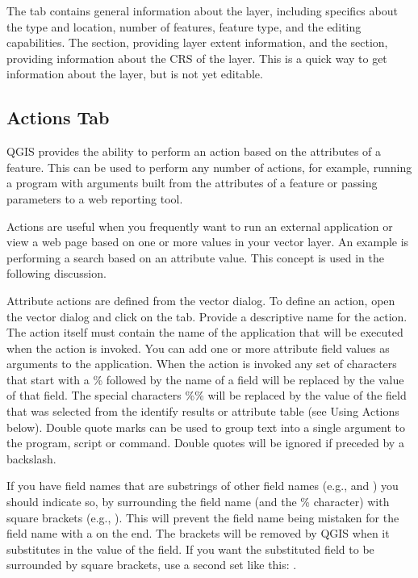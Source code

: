 The  tab contains general information about the layer,
including specifics about the type and location, number of features, feature
type, and the editing capabilities. The  section,
providing
layer extent information, and the 
section, providing information about the CRS of the layer. This is a quick
way to get information about the layer, but is not yet editable.

\subsection{Actions Tab}\label{label_actions}

QGIS provides the ability to perform an action based on the attributes of a
feature. This can be used to perform any number of actions, for example,
running a program with arguments built from the attributes of a feature or
passing parameters to a web reporting tool.

Actions are useful when you frequently want to run an external application or
view a web page based on one or more values in your vector layer. An example
is performing a search based on an attribute value. This concept is used in 
the following discussion.


Attribute actions are defined from the vector  dialog. To
define an action, open the vector  dialog and click on the
 tab. Provide a descriptive name for the action. The action
itself must contain the name of the application that will be executed when the
action is invoked. You can add one or more attribute field values as arguments
to the application. When the action is invoked any set of characters that
start with a \% followed by the name of a field will be replaced by the value of
that field. The special characters \%\% \index{\%\%}will be replaced by the value
of the field that was selected from the identify results or attribute table (see
Using Actions below).  Double quote marks can be used to group text into a
single argument to the program, script or command. Double quotes will be
ignored if preceded by a backslash.

If you have field names that are substrings of other field names (e.g., 
and ) you should
indicate so, by surrounding the field name (and the \% character) with square
brackets (e.g., \usertext{[\%col10]}). This will prevent the  field
name being mistaken for the  field name with a 
on the end. The brackets will be removed by QGIS when it substitutes in the
value of the field. If you want the substituted field to be surrounded by square
brackets, use a second set like this: \usertext{[[\%col10]]}.

